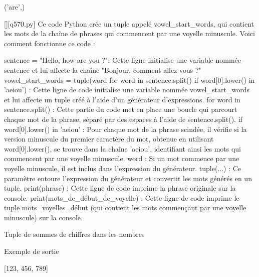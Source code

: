 ('are',)
        \par
        \begin{solution}
            \renewcommand{\nomfichier}{q570.py}
            \pythonfile{\chemincode \nomfichier}[][\nomfichier]
            Ce code Python crée un tuple appelé vowel_start_words, qui contient les mots de la chaîne de phrases qui commencent par une voyelle minuscule. Voici comment fonctionne ce code :

    sentence = "Hello, how are you ?": Cette ligne initialise une variable nommée sentence et lui affecte la chaîne "Bonjour, comment allez-vous ?"
    vowel_start_words = tuple(word for word in sentence.split() if word[0].lower() in 'aeiou') : Cette ligne de code initialise une variable nommée vowel_start_words et lui affecte un tuple créé à l'aide d'un générateur d'expressions.
        for word in sentence.split() : Cette partie du code met en place une boucle qui parcourt chaque mot de la phrase, séparé par des espaces à l'aide de sentence.split().
        if word[0].lower() in 'aeiou' : Pour chaque mot de la phrase scindée, il vérifie si la version minuscule du premier caractère du mot, obtenue en utilisant word[0].lower(), se trouve dans la chaîne 'aeiou', identifiant ainsi les mots qui commencent par une voyelle minuscule.
        word : Si un mot commence par une voyelle minuscule, il est inclus dans l'expression du générateur.
        tuple(...) : Ce paramètre entoure l'expression du générateur et convertit les mots générés en un tuple.
    print(phrase) : Cette ligne de code imprime la phrase originale sur la console.
    print(mots_de_début_de_voyelle) : Cette ligne de code imprime le tuple mots_voyelles_début (qui contient les mots commençant par une voyelle minuscule) sur la console.
        \end{solution}
        

        \question
        Tuple de sommes de chiffres dans les nombres

Exemple de sortie

[123, 456, 789]

